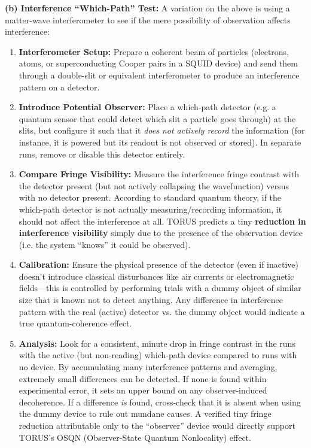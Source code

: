 \documentclass[
]{article}
\begin{document}
\textbf{(b) Interference ``Which-Path'' Test:} A variation on the above
is using a matter-wave interferometer to see if the mere possibility of
observation affects interference:

\begin{enumerate}
\def\labelenumi{\arabic{enumi}.}
\setcounter{enumi}{5}
\item
  \textbf{Interferometer Setup:} Prepare a coherent beam of particles
  (electrons, atoms, or superconducting Cooper pairs in a SQUID device)
  and send them through a double-slit or equivalent interferometer to
  produce an interference pattern on a detector.
\item
  \textbf{Introduce Potential Observer:} Place a which-path detector
  (e.g. a quantum sensor that could detect which slit a particle goes
  through) at the slits, but configure it such that it \emph{does not
  actively record} the information (for instance, it is powered but its
  readout is not observed or stored). In separate runs, remove or
  disable this detector entirely.
\item
  \textbf{Compare Fringe Visibility:} Measure the interference fringe
  contrast with the detector present (but not actively collapsing the
  wavefunction) versus with no detector present. According to standard
  quantum theory, if the which-path detector is not actually
  measuring/recording information, it should not affect the interference
  at all. TORUS predicts a tiny \textbf{reduction in interference
  visibility} simply due to the presence of the observation device (i.e.
  the system ``knows'' it could be observed)\hspace{0pt}.
\item
  \textbf{Calibration:} Ensure the physical presence of the detector
  (even if inactive) doesn't introduce classical disturbances like air
  currents or electromagnetic fields---this is controlled by performing
  trials with a dummy object of similar size that is known not to detect
  anything. Any difference in interference pattern with the real
  (active) detector vs. the dummy object would indicate a true
  quantum-coherence effect.
\item
  \textbf{Analysis:} Look for a consistent, minute drop in fringe
  contrast in the runs with the active (but non-reading) which-path
  device compared to runs with no device. By accumulating many
  interference patterns and averaging, extremely small differences can
  be detected. If none is found within experimental error, it sets an
  upper bound on any observer-induced decoherence. If a difference
  \emph{is} found, cross-check that it is absent when using the dummy
  device to rule out mundane causes. A verified tiny fringe reduction
  attributable only to the ``observer'' device would directly support
  TORUS's OSQN (Observer-State Quantum Nonlocality) effect.
\end{enumerate}
\end{document}
